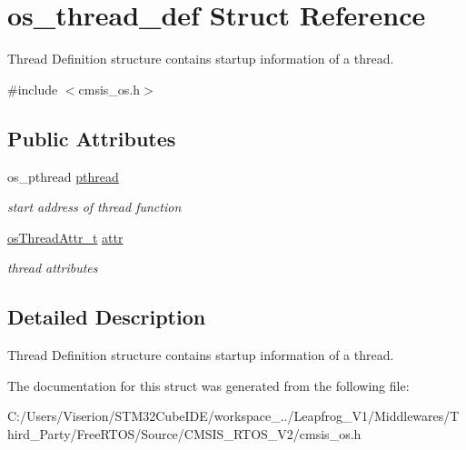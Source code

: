 \hypertarget{structos__thread__def}{}\section{os\+\_\+thread\+\_\+def Struct Reference}
\label{structos__thread__def}


Thread Definition structure contains startup information of a thread.  




{\ttfamily \#include $<$cmsis\+\_\+os.\+h$>$}

\subsection*{Public Attributes}
\begin{DoxyCompactItemize}
\item 
\mbox{\label{structos__thread__def_a0df2a4614d013387de75eebe66a6e3f9}} 
os\+\_\+pthread \mbox{\hyperlink{structos__thread__def_a0df2a4614d013387de75eebe66a6e3f9}{pthread}}
\begin{DoxyCompactList}\small\item\em start address of thread function \end{DoxyCompactList}\item 
\mbox{\label{structos__thread__def_a2d70e76fa99ba8db72705579b5b8d8ff}} 
\mbox{\hyperlink{structos_thread_attr__t}{os\+Thread\+Attr\+\_\+t}} \mbox{\hyperlink{structos__thread__def_a2d70e76fa99ba8db72705579b5b8d8ff}{attr}}
\begin{DoxyCompactList}\small\item\em thread attributes \end{DoxyCompactList}\end{DoxyCompactItemize}


\subsection{Detailed Description}
Thread Definition structure contains startup information of a thread. 

The documentation for this struct was generated from the following file\+:\begin{DoxyCompactItemize}
\item 
C\+:/\+Users/\+Viserion/\+S\+T\+M32\+Cube\+I\+D\+E/workspace\+\_../\+Leapfrog\+\_\+\+V1/\+Middlewares/\+Third\+\_\+\+Party/\+Free\+R\+T\+O\+S/\+Source/\+C\+M\+S\+I\+S\+\_\+\+R\+T\+O\+S\+\_\+\+V2/cmsis\+\_\+os.\+h\end{DoxyCompactItemize}
